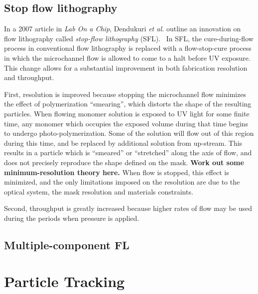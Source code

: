 \subsection{Stop flow lithography}
\label{sec:SFL}

In a 2007 article in \textit{Lab On a Chip}, Dendukuri \textit{et al.} outline an innovation on flow lithography
called \textit{stop-flow lithography} (SFL).~\cite{dendukuri-sfl} In SFL, the cure-during-flow
 
process in conventional flow lithography is replaced with a flow-stop-cure process in which the microchannel flow
is allowed to come to a halt before UV exposure. This change allows for a substantial improvement in both 
fabrication resolution and throughput.

First, resolution is improved because stopping the microchannel flow minimizes the effect of polymerization
``smearing'', which distorts the shape of the resulting particles.
When flowing monomer solution is exposed to UV light for some finite time, any monomer which occupies the exposed volume 
during that time begins to undergo photo-polymerization.  Some of the solution will flow out of this region 
during this time, and be replaced by additional solution from up-stream. This results in a particle which is ``smeared''
or ``stretched'' along the axis of flow, and does not precisely reproduce the shape defined on the mask.  
\textbf{Work out some minimum-resolution theory here.}
When flow is 
stopped, this effect is minimized, and the only limitations imposed on the resolution are due to the optical system,
the mask resolution and materials constraints.

Second, throughput is greatly increased because higher rates of flow may be used during the periods when pressure is
applied.  

\subsection{Multiple-component FL}

\section{Particle Tracking}

\begin{itemize}
\end{itemize}
